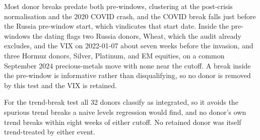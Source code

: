 Most donor breaks predate both pre-windows, clustering at the post-crisis normalisation and the
2020 COVID crash, and the COVID break falls just before the Russia pre-window start, which
vindicates that start date. Inside the pre-windows the dating flags two Russia donors, Wheat,
which the audit already excludes, and the VIX on 2022-01-07 about seven weeks before the
invasion, and three Hormuz donors, Silver, Platinum, and EM equities, on a common September 2024
precious-metals move with none near the cutoff. A break inside the pre-window is informative
rather than disqualifying, so no donor is removed by this test and the VIX is retained.

For the trend-break test all 32 donors classify as integrated, so it avoids the spurious trend
breaks a naive levels regression would find, and no donor's own trend breaks within eight weeks
of either cutoff. No retained donor was itself trend-treated by either event.
